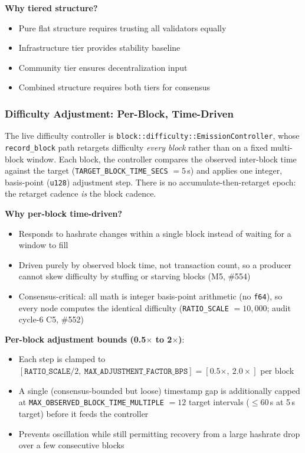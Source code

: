 \textbf{Why tiered structure?}
\begin{itemize}
  \item Pure flat structure requires trusting all validators equally
  \item Infrastructure tier provides stability baseline
  \item Community tier ensures decentralization input
  \item Combined structure requires both tiers for consensus
\end{itemize}

\subsubsection{Difficulty Adjustment: Per-Block, Time-Driven}

The live difficulty controller is \texttt{block::difficulty::EmissionController},
whose \texttt{record\_block} path retargets difficulty \emph{every block} rather
than on a fixed multi-block window. Each block, the controller compares the
observed inter-block time against the target
(\texttt{TARGET\_BLOCK\_TIME\_SECS} $= 5$\,s) and applies one integer,
basis-point (\texttt{u128}) adjustment step. There is no accumulate-then-retarget
epoch: the retarget cadence \emph{is} the block cadence.

\textbf{Why per-block time-driven?}
\begin{itemize}
  \item Responds to hashrate changes within a single block instead of waiting
    for a window to fill
  \item Driven purely by observed block time, not transaction count, so a
    producer cannot skew difficulty by stuffing or starving blocks (M5, \#554)
  \item Consensus-critical: all math is integer basis-point arithmetic
    (no \texttt{f64}), so every node computes the identical difficulty
    (\texttt{RATIO\_SCALE} $= 10{,}000$; audit cycle-6 C5, \#552)
\end{itemize}

\textbf{Per-block adjustment bounds (0.5$\times$ to 2$\times$)}:
\begin{itemize}
  \item Each step is clamped to
    $[\texttt{RATIO\_SCALE}/2,\ \texttt{MAX\_ADJUSTMENT\_FACTOR\_BPS}]
    = [0.5\times,\ 2.0\times]$ per block
  \item A single (consensus-bounded but loose) timestamp gap is additionally
    capped at \texttt{MAX\_OBSERVED\_BLOCK\_TIME\_MULTIPLE} $= 12$ target
    intervals ($\le 60$\,s at 5\,s target) before it feeds the controller
  \item Prevents oscillation while still permitting recovery from a large
    hashrate drop over a few consecutive blocks
\end{itemize}

